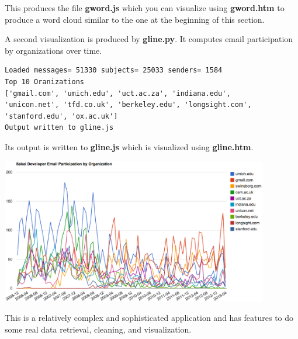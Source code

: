 This produces the file {\bf gword.js} which you can visualize using
{\bf gword.htm} to produce a word cloud similar to the one at the beginning 
of this section.

A second visualization is produced  by {\bf gline.py}.  It computes email 
participation by organizations over time.

\beforeverb
\begin{verbatim}
Loaded messages= 51330 subjects= 25033 senders= 1584
Top 10 Oranizations
['gmail.com', 'umich.edu', 'uct.ac.za', 'indiana.edu', 
'unicon.net', 'tfd.co.uk', 'berkeley.edu', 'longsight.com', 
'stanford.edu', 'ox.ac.uk']
Output written to gline.js
\end{verbatim}
\afterverb
%
Its output is written to {\bf gline.js} which is visualized using {\bf gline.htm}.

\beforefig
\centerline{\includegraphics[height=2.50in]{figs2/mailorg.eps}}
\afterfig

This is a relatively complex and sophisticated application and 
has features to do some real data retrieval, cleaning, and visualization.
